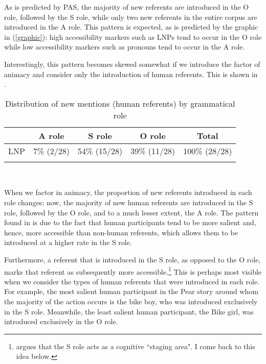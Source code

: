 As is predicted by PAS, the majority of new referents are introduced in the O role, followed by the S role, while only two new referents in the entire corpus are introduced in the A role. This pattern is expected, as is predicted by the graphic in (\ref{graphic}): high accessibility markers such as LNPs tend to occur in the O role while low accessibility markers such as pronouns tend to occur in the A role.

Interestingly, this pattern becomes skewed somewhat if we introduce the factor of animacy and consider only the introduction of human referents. This is shown in .

\begin{table} 

\caption{{Distribution of new mentions (human referents) by grammatical role}}
\begin{tabular}{ r  c  c  c  c }
\lsptoprule
 & A role & S role & O role & Total\\

\midrule
 \textsc{LNP} & 7{\%} (2/28) & 54{\%} (15/28) & 39{\%} (11/28) & 100{\%} (28/28) \\

\lspbottomrule
\end{tabular}\\
\label{newhumanreferents}

\end{table}

When we factor in animacy, the proportion of new referents introduced in each role changes: now, the majority of new human referents are introduced in the S role, followed by the O role, and to a much lesser extent, the A role. The pattern found in  is due to the fact that human participants tend to be more salient and, hence, more accessible than non-human referents, which allows them to be introduced at a higher rate in the S role. 

Furthermore, a referent that is introduced in the S role, as opposed to the O role, marks that referent as subsequently more accessible.\footnote{\citet[831]{dubois1987} argues that the S role acts as a cognitive ``staging area". I come back to this idea below.} This is perhaps most visible when we consider the types of human referents that were introduced in each role. For example, the most salient human participant in the Pear story around whom the majority of the action occurs is the bike boy, who was introduced exclusively in the S role. Meanwhile, the least salient human participant, the Bike girl, was introduced exclusively in the O role. 


